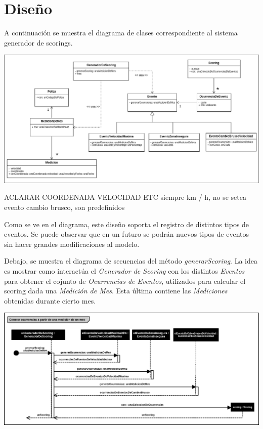 \section{Diseño}

A continuación se muestra el diagrama de clases correspondiente al sistema generador 
de scorings.
\newline

\centerline{\includegraphics[width=1\textwidth]{./imagenes/clases.png}}
ACLARAR COORDENADA VELOCIDAD ETC siempre km / h, no se setea evento cambio brusco, son predefinidos


Como se ve en el diagrama, este diseño soporta el registro de distintos tipos de 
eventos. Se puede observar que en un futuro se podrán nuevos tipos de eventos 
sin hacer grandes modificaciones al modelo.


Debajo, se muestra el diagrama de secuencias del método \textit{generarScoring}.
La idea es mostrar como interactúa el \textit{Generador de Scoring} con los distintos
\textit{Eventos} para obtener el cojunto de \textit{Ocurrencias de Eventos}, utilizados
para calcular el scoring dada una \textit{Medición de Mes}. Esta última contiene las 
\textit{Mediciones} obtenidas durante cierto mes.
\newline

\centerline{\includegraphics[width=1\textwidth]{./imagenes/secuencias_general.png}}



